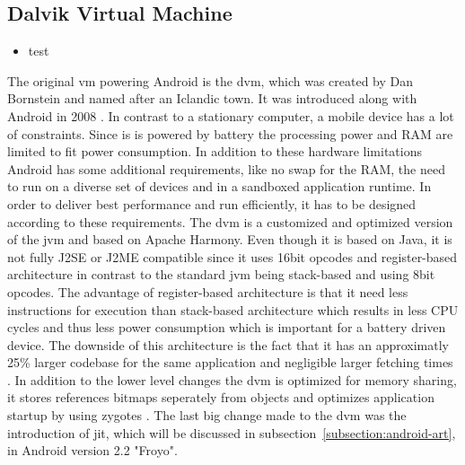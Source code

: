 \subsection{Dalvik Virtual Machine} \label{subsection:android-dalvik}
\begin{itemize}
    \item test
\end{itemize}
The original \gls{vm} powering Android is the \gls{dvm}, which was created by Dan Bornstein and named after an Iclandic town. It was introduced along with Android in 2008 \cite{developersRelease}.
\newline
In contrast to a stationary computer, a mobile device has a lot of constraints.
Since is is powered by battery the processing power and RAM are limited to fit power consumption.
In addition to these hardware limitations Android has some additional requirements, like no swap for the RAM, the need to run on a diverse set of devices and in a sandboxed application runtime.
In order to deliver best performance and run efficiently, it has to be designed according to these requirements.
The \gls{dvm} is a customized and optimized version of the \gls{jvm} and based on Apache Harmony.
Even though it is based on Java, it is not fully J2SE or J2ME compatible since it uses 16bit opcodes and register-based architecture in contrast to the standard \gls{jvm} being stack-based and using 8bit opcodes.
The advantage of register-based architecture is that it need less instructions for execution than stack-based architecture which results in less CPU cycles and thus less power consumption which is important for a battery driven device.
The downside of this architecture is the fact that it has an approximatly 25\% larger codebase for the same application and negligible larger fetching times \cite{ehringerDalvik}.
In addition to the lower level changes the \gls{dvm} is optimized for memory sharing, it stores references bitmaps seperately from objects and optimizes application startup by using zygotes \cite{andevconDalvikART}.
\newline
The last big change made to the \gls{dvm} was the introduction of \gls{jit}, which will be discussed in subsection~\ref{subsection:android-art}, in Android version 2.2 "Froyo".
